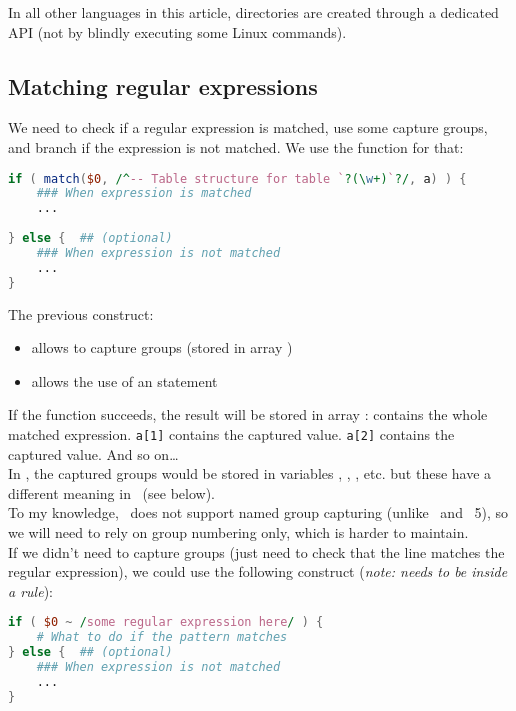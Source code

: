 In all other languages in this article, directories are created through a dedicated API (not by blindly executing some Linux commands). \\


\subsection*{Matching regular expressions}

We need to check if a regular expression is matched, use some capture groups, and branch if the expression is not matched. We use the  function for that:

\begin{lstlisting}[language=awk]
if ( match($0, /^-- Table structure for table `?(\w+)`?/, a) ) {
	### When expression is matched
	...
	
} else {  ## (optional)
	### When expression is not matched
	...
}
\end{lstlisting}

The previous construct:
\begin{itemize}
	\item allows to capture groups (stored in array )
	\item allows the use of an  statement
\end{itemize}

If the  function succeeds, the result will be stored in array : \newline
{} contains the whole matched expression. \newline
\lstinline|a[1]| contains the  captured value. \newline
\lstinline|a[2]| contains the  captured value. \newline
And so on\dots \\

In \perl, the captured groups would be stored in variables , , , etc. but these have a different meaning in \awk\ (see below). \\

To my knowledge, \gawk\ does not support named group capturing (unlike \python\ and \perl\ 5), so we will need to rely on group numbering only, which is harder to maintain. \\


If we didn't need to capture groups (just need to check that the line matches the regular expression), we could use the following construct (\emph{note: needs to be inside a rule}):
\begin{lstlisting}[language=awk]
if ( $0 ~ /some regular expression here/ ) {
	# What to do if the pattern matches
} else {  ## (optional)
	### When expression is not matched
	...
}
\end{lstlisting}

